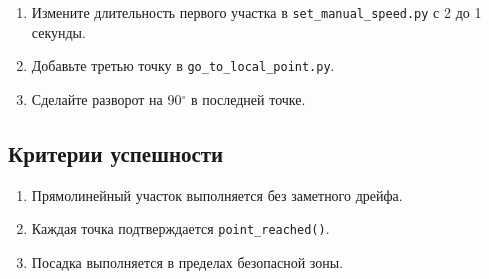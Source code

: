 \begin{taskbox}
\begin{enumerate}
\item Измените длительность первого участка в \texttt{set\_manual\_speed.py} с 2 до 1 секунды.
\item Добавьте третью точку в \texttt{go\_to\_local\_point.py}.
\item Сделайте разворот на 90$^\circ$ в последней точке.
\end{enumerate}
\end{taskbox}

\subsection{Критерии успешности}
\begin{enumerate}
\item Прямолинейный участок выполняется без заметного дрейфа.
\item Каждая точка подтверждается \texttt{point\_reached()}.
\item Посадка выполняется в пределах безопасной зоны.
\end{enumerate}
